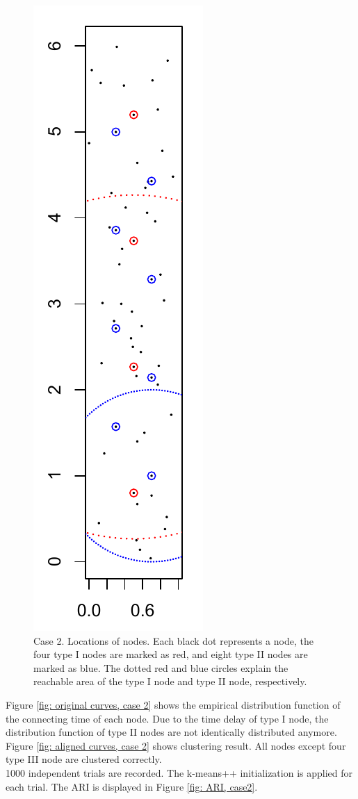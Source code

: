 \begin{figure}[]
\includegraphics[width=.2\linewidth]{../simulation/plots/nodes_2_108}
\caption{Case 2. Locations of nodes. Each black dot represents a node, the four type I nodes are marked as red, and eight type II nodes are marked as blue. The dotted red and blue circles explain the reachable area of the type I node and type II node, respectively. }
\label{fig: nodes locations, case 2}
\end{figure}

\noindent
Figure \ref{fig: original curves, case 2} shows the empirical distribution function of the connecting time of each node. Due to the time delay of type I node, the distribution function of type II nodes are not identically distributed anymore.
Figure \ref{fig: aligned curves, case 2} shows clustering result. All nodes except four type III node are clustered correctly.
\\
1000 independent trials are recorded. 
The k-means++ initialization is applied for each trial.
The ARI is displayed in Figure \ref{fig: ARI, case2}.


